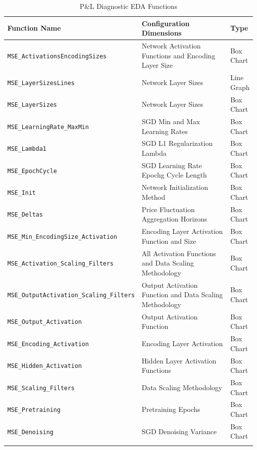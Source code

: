 \documentclass[a4paper,11pt,oneside]{article}
\theoremstyle{plain}
\theoremstyle{definition}
\begin{document}
\begin{longtable}{|p{0.5\linewidth}|p{0.4\linewidth}|p{0.1\linewidth}|}
		\hline
		\textbf{Function Name} &\textbf{Configuration Dimensions}&\textbf{Type}  \\\hline	
		\texttt{MSE\_ActivationsEncodingSizes} & {Network Activation Functions and Encoding Layer Size}& {Box Chart} \\\hline
		\texttt{MSE\_LayerSizesLines} & {Network Layer Sizes}& {Line Graph} \\\hline
		\texttt{MSE\_LayerSizes} & {Network Layer Sizes}& {Box Chart} \\\hline
		\texttt{MSE\_LearningRate\_MaxMin} & {SGD Min and Max Learning Rates}& {Box Chart} \\\hline
		\texttt{MSE\_Lambda1} & {SGD L1 Regularization Lambda}& {Box Chart} \\\hline
		\texttt{MSE\_EpochCycle} & {SGD Learning Rate Epochg Cycle Length}& {Box Chart} \\\hline
		\texttt{MSE\_Init} & {Network Initialization Method}& {Box Chart} \\\hline
		\texttt{MSE\_Deltas} & {Price Fluctuation Aggregation Horizons}& {Box Chart} \\\hline
		\texttt{MSE\_Min\_EncodingSize\_Activation} & {Encoding Layer Activation Function and Size}& {Box Chart} \\\hline
		\texttt{MSE\_Activation\_Scaling\_Filters} & {All Activation Functions and Data Scaling Methodology}& {Box Chart} \\\hline
		\texttt{MSE\_OutputActivation\_Scaling\_Filters} & {Output Activation Function and Data Scaling Methodology}& {Box Chart} \\\hline
		\texttt{MSE\_Output\_Activation} & {Output Activation Function}& {Box Chart} \\\hline
		\texttt{MSE\_Encoding\_Activation} & {Encoding Layer Activation}& {Box Chart} \\\hline
		\texttt{MSE\_Hidden\_Activation} & {Hidden Layer Activation Functions}& {Box Chart} \\\hline
		\texttt{MSE\_Scaling\_Filters} & {Data Scaling Methodology}& {Box Chart} \\\hline
		\texttt{MSE\_Pretraining} & {Pretraining Epochs}& {Box Chart} \\\hline
		\texttt{MSE\_Denoising} & {SGD Denoising Variance}& {Box Chart} \\\hline

	\caption{P\&L Diagnostic EDA Functions}
	\label{tab_diagnostics_mse}
\end{longtable}



\newpage






\end{document}
